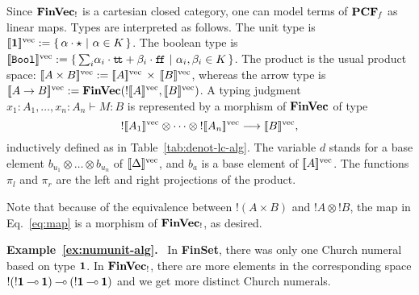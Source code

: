 \documentclass[10pt]{article}
\theoremstyle{plain}
\theoremstyle{definition}
\newcommand{\bor}{\ |\ }
\newcommand{\tensor}{\otimes}
\newcommand{\loli}{\mathbin{\multimap}}
\newcommand{\FinSet}{\mbox{\bf FinSet}}
\newcommand{\FinVec}{\mbox{\bf FinVec}}
\newcommand{\tunit}{{\bf 1}}
\newcommand{\ttrue}{{\tt t}\!{\tt t}}
\newcommand{\ffalse}{{\tt f}\!{\tt f}}
\newcommand{\bit}{{\tt Bool}}
\newcommand{\defas}{\mathrel{{:}{=}}}
\newcommand{\fvdenot}[1]{{[\![{#1}]\!]^{\rm vec}}}
\begin{document}
Since ${\FinVec}_!$ is a cartesian closed category, one can model
terms of ${\bf PCF}_{\it f}$ as linear maps. Types are interpreted as
follows. The unit type is $\fvdenot{\tunit} \defas \{\,
\alpha\cdot\star\bor \alpha\in K \,\}$. The boolean type is
$\fvdenot{\bit} \defas \{\, {\textstyle\sum_i} \alpha_i\cdot\ttrue +
\beta_i\cdot\ffalse \bor\alpha_i,\beta_i\in K\,\}$. The product is the
usual product space: $\fvdenot{A\times B} \defas
\fvdenot{A}\,\times\,\fvdenot{B}$, whereas the arrow type is
$\fvdenot{A\to B} \defas {\FinVec}({!\fvdenot{A}},\fvdenot{B})$.
A typing judgment $x_1:A_1,\ldots,x_n:A_n\vdash M:B$ is represented
by a morphism of $\FinVec$ of type
\begin{equation}
  \label{eq:map}
  !\fvdenot{A_1}\otimes\cdots\otimes{!}\fvdenot{A_n}\longrightarrow
  \fvdenot{B},
\end{equation}
inductively defined as in Table~\ref{tab:denot-lc-alg}. The
variable $d$ stands for a base element $b_{u_1}\tensor\ldots\tensor
b_{u_n}$ of $\fvdenot{\Delta}$, and $b_a$ is a base element of
$\fvdenot{A}$. The functions $\pi_l$ and $\pi_r$ are the left and
right projections of the product.

  Note that because of the equivalence between ${!(A\times B)}$ and
  ${!A}\otimes {!B}$, the map in Eq.~\eqref{eq:map} is a morphism of
  ${\FinVec}_!$, as desired.


\label{ex:numunit-alg}\medskip
\noindent
{\bf Example~\ref{ex:numunit-alg}.}~
In {\FinSet}, there was only one Church numeral based on type
  $\tunit$. In ${\FinVec}_!$, there are more elements in the
  corresponding space
  $!({!\tunit}\loli\tunit)\loli({!\tunit}\loli\tunit)$ and we get more
  distinct Church numerals.
\end{document}
